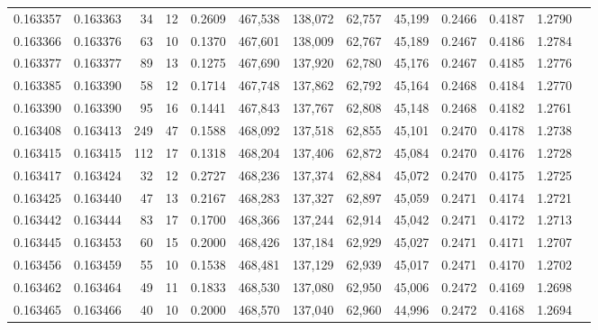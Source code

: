 \begin{tabular}{rrrrrrrrrrrrr}
0.163357 & 0.163363 &    34 &  12 &                                     0.2609 & 467,538 & 138,072 &  62,757 &  45,199 & 0.2466 & 0.4187 & 1.2790 \\
0.163366 & 0.163376 &    63 &  10 &                                     0.1370 & 467,601 & 138,009 &  62,767 &  45,189 & 0.2467 & 0.4186 & 1.2784 \\
0.163377 & 0.163377 &    89 &  13 &                                     0.1275 & 467,690 & 137,920 &  62,780 &  45,176 & 0.2467 & 0.4185 & 1.2776 \\
0.163385 & 0.163390 &    58 &  12 &                                     0.1714 & 467,748 & 137,862 &  62,792 &  45,164 & 0.2468 & 0.4184 & 1.2770 \\
0.163390 & 0.163390 &    95 &  16 &                                     0.1441 & 467,843 & 137,767 &  62,808 &  45,148 & 0.2468 & 0.4182 & 1.2761 \\
0.163408 & 0.163413 &   249 &  47 &                                     0.1588 & 468,092 & 137,518 &  62,855 &  45,101 & 0.2470 & 0.4178 & 1.2738 \\
0.163415 & 0.163415 &   112 &  17 &                                     0.1318 & 468,204 & 137,406 &  62,872 &  45,084 & 0.2470 & 0.4176 & 1.2728 \\
0.163417 & 0.163424 &    32 &  12 &                                     0.2727 & 468,236 & 137,374 &  62,884 &  45,072 & 0.2470 & 0.4175 & 1.2725 \\
0.163425 & 0.163440 &    47 &  13 &                                     0.2167 & 468,283 & 137,327 &  62,897 &  45,059 & 0.2471 & 0.4174 & 1.2721 \\
0.163442 & 0.163444 &    83 &  17 &                                     0.1700 & 468,366 & 137,244 &  62,914 &  45,042 & 0.2471 & 0.4172 & 1.2713 \\
0.163445 & 0.163453 &    60 &  15 &                                     0.2000 & 468,426 & 137,184 &  62,929 &  45,027 & 0.2471 & 0.4171 & 1.2707 \\
0.163456 & 0.163459 &    55 &  10 &                                     0.1538 & 468,481 & 137,129 &  62,939 &  45,017 & 0.2471 & 0.4170 & 1.2702 \\
0.163462 & 0.163464 &    49 &  11 &                                     0.1833 & 468,530 & 137,080 &  62,950 &  45,006 & 0.2472 & 0.4169 & 1.2698 \\
0.163465 & 0.163466 &    40 &  10 &                                     0.2000 & 468,570 & 137,040 &  62,960 &  44,996 & 0.2472 & 0.4168 & 1.2694 \\

\end{tabular}

